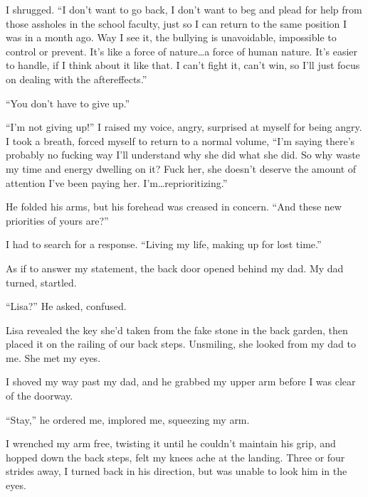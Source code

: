 I shrugged.  ``I don't want to go back, I don't want to beg and plead for help from those assholes in the school faculty, just so I can return to the same position I was in a month ago.  Way I see it, the bullying is unavoidable, impossible to control or prevent.  It's like a force of nature\ldots a force of human nature.  It's easier to handle, if I think about it like that.  I can't fight it, can't win, so I'll just focus on dealing with the aftereffects.''



``You don't have to give up.''



``I'm not giving up!''  I raised my voice, angry, surprised at myself for being angry.  I took a breath, forced myself to return to a normal volume, ``I'm saying there's probably no fucking way I'll understand why she did what she did.  So why waste my time and energy dwelling on it?  Fuck her, she doesn't deserve the amount of attention I've been paying her. I'm\ldots reprioritizing.''



He folded his arms, but his forehead was creased in concern.  ``And these new priorities of yours are?''



I had to search for a response.  ``Living my life, making up for lost time.''



As if to answer my statement, the back door opened behind my dad.  My dad turned, startled.



``Lisa?'' He asked, confused.



Lisa revealed the key she'd taken from the fake stone in the back garden, then placed it on the railing of our back steps.  Unsmiling, she looked from my dad to me.  She met my eyes.



I shoved my way past my dad, and he grabbed my upper arm before I was clear of the doorway.



``Stay,'' he ordered me, implored me, squeezing my arm.



I wrenched my arm free, twisting it until he couldn't maintain his grip, and hopped down the back steps, felt my knees ache at the landing.  Three or four strides away, I turned back in his direction, but was unable to look him in the eyes.



